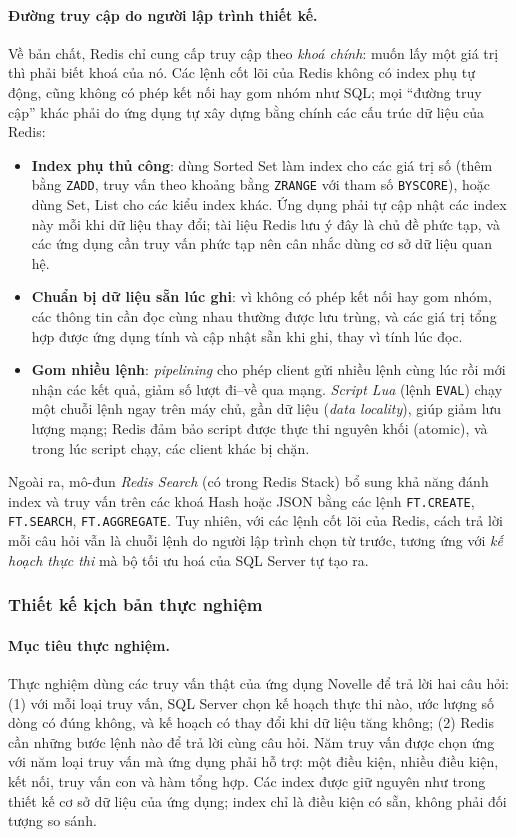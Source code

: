 \paragraph{Đường truy cập do người lập trình thiết kế.}
Về bản chất, Redis chỉ cung cấp truy cập theo \textit{khoá chính}: muốn lấy một giá trị thì phải biết khoá của nó. Các lệnh cốt lõi của Redis không có index phụ tự động, cũng không có phép kết nối hay gom nhóm như SQL; mọi ``đường truy cập'' khác phải do ứng dụng tự xây dựng bằng chính các cấu trúc dữ liệu của Redis:
\begin{itemize}
    \item \textbf{Index phụ thủ công}: dùng Sorted Set làm index cho các giá trị số (thêm bằng \texttt{ZADD}, truy vấn theo khoảng bằng \texttt{ZRANGE} với tham số \texttt{BYSCORE}), hoặc dùng Set, List cho các kiểu index khác. Ứng dụng phải tự cập nhật các index này mỗi khi dữ liệu thay đổi; tài liệu Redis lưu ý đây là chủ đề phức tạp, và các ứng dụng cần truy vấn phức tạp nên cân nhắc dùng cơ sở dữ liệu quan hệ.
    \item \textbf{Chuẩn bị dữ liệu sẵn lúc ghi}: vì không có phép kết nối hay gom nhóm, các thông tin cần đọc cùng nhau thường được lưu trùng, và các giá trị tổng hợp được ứng dụng tính và cập nhật sẵn khi ghi, thay vì tính lúc đọc.
    \item \textbf{Gom nhiều lệnh}: \textit{pipelining} cho phép client gửi nhiều lệnh cùng lúc rồi mới nhận các kết quả, giảm số lượt đi--về qua mạng. \textit{Script Lua} (lệnh \texttt{EVAL}) chạy một chuỗi lệnh ngay trên máy chủ, gần dữ liệu (\textit{data locality}), giúp giảm lưu lượng mạng; Redis đảm bảo script được thực thi nguyên khối (atomic), và trong lúc script chạy, các client khác bị chặn.
\end{itemize}
Ngoài ra, mô-đun \textit{Redis Search} (có trong Redis Stack) bổ sung khả năng đánh index và truy vấn trên các khoá Hash hoặc JSON bằng các lệnh \texttt{FT.CREATE}, \texttt{FT.SEARCH}, \texttt{FT.AGGREGATE}. Tuy nhiên, với các lệnh cốt lõi của Redis, cách trả lời mỗi câu hỏi vẫn là chuỗi lệnh do người lập trình chọn từ trước, tương ứng với \textit{kế hoạch thực thi} mà bộ tối ưu hoá của SQL Server tự tạo ra.

\subsubsection{Thiết kế kịch bản thực nghiệm}

\paragraph{Mục tiêu thực nghiệm.}
Thực nghiệm dùng các truy vấn thật của ứng dụng Novelle để trả lời hai câu hỏi: (1) với mỗi loại truy vấn, SQL Server chọn kế hoạch thực thi nào, ước lượng số dòng có đúng không, và kế hoạch có thay đổi khi dữ liệu tăng không; (2) Redis cần những bước lệnh nào để trả lời cùng câu hỏi. Năm truy vấn được chọn ứng với năm loại truy vấn mà ứng dụng phải hỗ trợ: một điều kiện, nhiều điều kiện, kết nối, truy vấn con và hàm tổng hợp. Các index được giữ nguyên như trong thiết kế cơ sở dữ liệu của ứng dụng; index chỉ là điều kiện có sẵn, không phải đối tượng so sánh.

